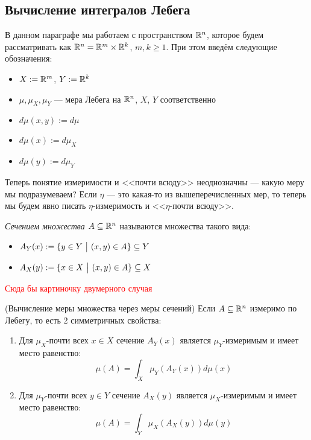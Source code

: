 \subsection{Вычисление интегралов Лебега}

\begin{note}
	В данном параграфе мы работаем с пространством $\mathbb{R}^n$, которое будем рассматривать как $\mathbb{R}^n = \mathbb{R}^m \times \mathbb{R}^k$, $m, k \ge 1$. При этом введём следующие обозначения:
	\begin{itemize}
		\item $X := \mathbb{R}^m$, $Y := \mathbb{R}^k$
		
		\item $\mu, \mu_X, \mu_Y$ --- мера Лебега на $\mathbb{R}^n$, $X$, $Y$ соответственно
		
		\item $d\mu(x, y) := d\mu$
		
		\item $d\mu(x) := d\mu_X$
		
		\item $d\mu(y) := d\mu_Y$
	\end{itemize}
	Теперь понятие измеримости и <<почти всюду>> неоднозначны --- какую меру мы подразумеваем? Если $\eta$ --- это какая-то из вышеперечисленных мер, то теперь мы будем явно писать $\eta$-измеримость и <<$\eta$-почти всюду>>.
\end{note}

\begin{definition}
	\textit{Сечением множества} $A \subseteq \mathbb{R}^n$ называются множества такого вида:
	\begin{itemize}
		\item $A_Y(x) := \{y \in Y \ \big|\  (x, y) \in A\} \subseteq Y$
		
		\item $A_X(y) := \{x \in X \ \big|\  (x, y) \in A\} \subseteq X$
	\end{itemize}
\end{definition}

\textcolor{red}{Сюда бы картиночку двумерного случая}

\begin{theorem} (Вычисление меры множества через меры сечений)
	Если $A \subseteq \mathbb{R}^n$ измеримо по Лебегу, то есть 2 симметричных свойства:
	\begin{enumerate}
		\item Для $\mu_X$-почти всех $x \in X$ сечение $A_Y(x)$ является $\mu_Y$-измеримым и имеет место равенство:
		\[
			\mu(A) = \int_X \mu_Y(A_Y(x))d\mu(x)
		\]
		
		\item Для $\mu_Y$-почти всех $y \in Y$ сечение $A_X(y)$ является $\mu_X$-измеримым и имеет место равенство:
		\[
		\mu(A) = \int_Y \mu_X(A_X(y))d\mu(y)
		\]
	\end{enumerate}
\end{theorem}

